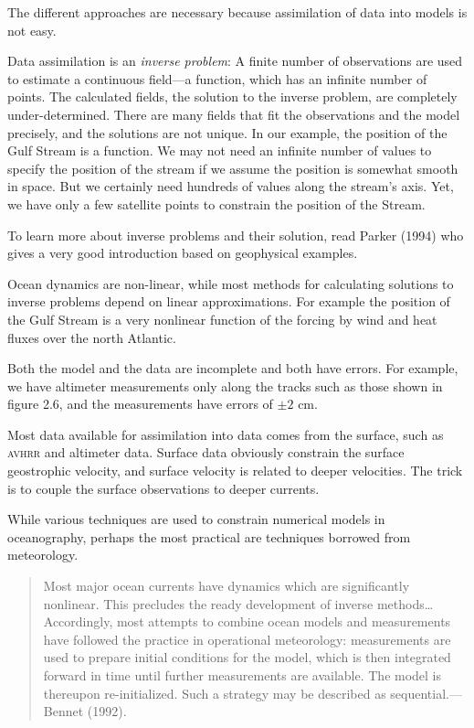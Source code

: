 The different approaches are necessary because assimilation of data into models is not easy.
\begin{enumerate}
\vitem Data assimilation is an \textit{inverse problem}: A finite number of observations are used to estimate a continuous field---a
function, which has an infinite number of points. The calculated fields, the solution to the
inverse problem, are completely under-determined. There are many fields that fit the
observations and the model precisely, and the solutions are not unique. In our
example, the position of the Gulf Stream is a function. We may
not need an infinite number of values to specify the position of the stream if we assume the
position is somewhat smooth in space. But we certainly need hundreds of values along the
stream's axis. Yet, we have only a few satellite points to constrain the position of
the Stream.

To learn more about inverse problems and their solution, read Parker (1994) who
gives a very good introduction based on geophysical examples.

\vitem Ocean dynamics are non-linear, while most methods for calculating solutions
to inverse problems depend on linear approximations. For example the position of
the Gulf Stream is a very nonlinear function of the forcing by
wind and heat fluxes over the north Atlantic.

\vitem Both the model and the data are incomplete and both have errors. For example, we have altimeter measurements only along the tracks such as those shown in figure 2.6, and the measurements have errors of $\pm 2$ cm.

\vitem Most data available for assimilation into data comes from the
surface, such as \textsc{avhrr} and
altimeter data. Surface data obviously constrain the surface geostrophic
velocity, and surface velocity is
related to deeper velocities. The trick is to couple the surface observations to deeper
currents.
\end{enumerate}

While various techniques are used to constrain numerical models in oceanography, perhaps the most practical are techniques borrowed from meteorology.
\begin{quote} \small
Most major ocean currents have dynamics which are significantly nonlinear. This precludes the ready development of inverse methods\dots Accord\-ing\-ly, most attempts to combine ocean models and
measurements have followed the practice in operational meteorology: measurements are used to prepare initial conditions for the model, which is then integrated forward in time until further measurements are available. The model is thereupon re-initialized. Such a strategy may be described as sequential.---Bennet (1992).
\end{quote}

